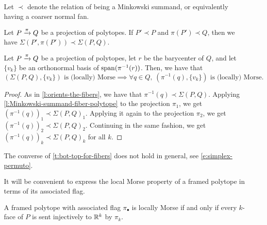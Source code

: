 Let $\prec$ denote the relation of being a Minkowski summand, or equivalently having a coarser normal fan.  

\begin{lemma}{{\cite[Lemma 3.1]{BilleraSturmfels94}}}
\label{l:Minkowski-summand-fiber-polytope}
	Let $P \xrightarrow{\pi} Q$ be a projection of polytopes.
	If $P' \prec P$ and $\pi(P') \prec Q$, then we have $\Sigma(P', \pi(P')) \prec \Sigma(P,Q)$.
\end{lemma}

\begin{theorem}
\label{t:bot-top-for-fibers}
	Let $P \xrightarrow{\pi} Q$ be a projection of polytopes, let $r$ be the barycenter of $Q$, and let $\{v_k\}$ be an orthonormal basis of $\operatorname{\mathrm{span}}(\pi^{-1}(r))$.
	Then, we have that
	\[
	(\Sigma(P,Q),\{v_k\}) \text{ is (locally) Morse}
	\implies
	\forall q \in Q, \ (\pi^{-1}(q),\{v_k\}) \text{ is (locally) Morse}.
	\]
\end{theorem}

\begin{proof}
	As in \cref{l:orients-the-fibers}, we have that $\pi^{-1}(q) \prec \Sigma(P,Q)$. 
	Applying \cref{l:Minkowski-summand-fiber-polytope} to the projection $\pi_1$, we get $(\pi^{-1}(q))_1 \prec \Sigma(P,Q)_1$. 
	Applying it again to the projection $\pi_2$, we get $(\pi^{-1}(q))_2 \prec \Sigma(P,Q)_2$.
	Continuing in the same fashion, we get $(\pi^{-1}(q))_k \prec \Sigma(P,Q)_k$ for all $k$.
\end{proof}

The converse of \cref{t:bot-top-for-fibers} does not hold in general, see \cref{e:simplex-permuto}.

It will be convenient to express the local Morse property of a framed polytope in terms of its associated flag.

\begin{theorem}
\label{t:Morse-injectivity}
	A framed polytope with associated flag $\pi_\bullet$ is locally Morse if and only if every $k$-face of $P$ is sent injectively to $\mathbb{R}^k$ by $\pi_k$.
\end{theorem}


